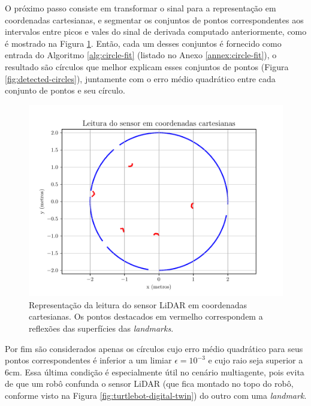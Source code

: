 O próximo passo consiste em transformar o sinal para a representação em 
coordenadas cartesianas, e segmentar os conjuntos de pontos correspondentes aos intervalos entre picos e vales do sinal de derivada computado anteriormente, como é mostrado na Figura \ref{fig:sensor-data-cartesian}.
Então, cada um desses conjuntos é fornecido como entrada do Algoritmo 
\ref{alg:circle-fit} (listado no Anexo \ref{annex:circle-fit}), o resultado 
são círculos que melhor explicam esses conjuntos de pontos (Figura \ref{fig:detected-circles}), juntamente com o 
erro médio quadrático entre cada conjunto de pontos e seu círculo.
\begin{figure}[h]
  \centering
  \includegraphics[width=.8\textwidth]{figs/sensor_data_cartesian.pdf}
  \caption{Representação da leitura do sensor LiDAR em coordenadas 
  cartesianas. Os pontos destacados em vermelho correspondem a reflexões 
  das superfícies das \textit{landmarks}.}
  \label{fig:sensor-data-cartesian}
\end{figure}

Por fim são considerados apenas os círculos cujo erro médio quadrático para 
seus pontos correspondentes é inferior a um limiar $\epsilon = 10^{-3}$ e 
cujo raio seja superior a 6cm. Essa última condição é especialmente útil no 
cenário multiagente, pois evita de que um robô confunda o sensor LiDAR (que 
fica montado no topo do robô, conforme visto na Figura \ref{fig:turtlebot-digital-twin}) do outro com uma \textit{landmark}.

